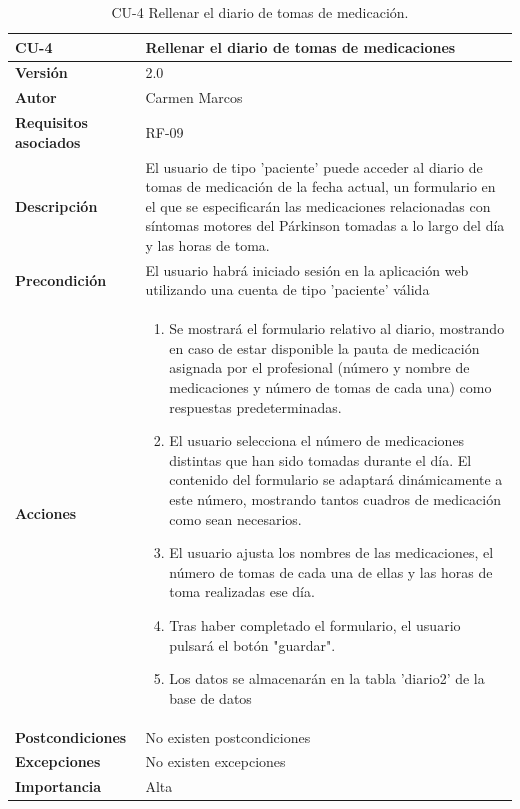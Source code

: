 \begin{table}[p]
	\centering
	\begin{tabularx}{\linewidth}{ p{} p{} }
		\toprule
		\textbf{CU-4}    & \textbf{Rellenar el diario de tomas de medicaciones}\\
		\toprule
		\textbf{Versión}              & 2.0    \\
		\textbf{Autor}                & Carmen Marcos \\
		\textbf{Requisitos asociados} & RF-09 \\
		\textbf{Descripción}          & El usuario de tipo 'paciente' puede acceder al diario de tomas de medicación de la fecha actual, un formulario en el que se especificarán las medicaciones relacionadas con síntomas motores del Párkinson tomadas a lo largo del día y las horas de toma.
        \\
		\textbf{Precondición}         & El usuario habrá iniciado sesión en la aplicación web utilizando una cuenta de tipo 'paciente' válida
		\\
		\textbf{Acciones}             & \begin{enumerate} \def\labelenumi{\arabic{enumi}.}
	\tightlist
		\item Se mostrará el formulario relativo al diario, mostrando en caso de estar disponible la pauta de medicación asignada por el profesional (número y nombre de medicaciones y número de tomas de cada una) como respuestas predeterminadas.
        \item El usuario selecciona el número de medicaciones distintas que han sido tomadas durante el día. El contenido del formulario se adaptará dinámicamente a este número, mostrando tantos cuadros de medicación como sean necesarios.
        \item El usuario ajusta los nombres de las medicaciones, el número de tomas de cada una de ellas y las horas de toma realizadas ese día.
        \item Tras haber completado el formulario, el usuario pulsará el botón "guardar".
        \item Los datos se almacenarán en la tabla 'diario2' de la base de datos
		\end{enumerate}\\
		\textbf{Postcondiciones}        & 		No existen postcondiciones
  \\
		\textbf{Excepciones}          & No existen excepciones \\
		\textbf{Importancia}          & Alta \\
		\bottomrule
	\end{tabularx}
	\caption{CU-4 Rellenar el diario de tomas de medicación.}
        \label{tab:CU-4}
\end{table}

